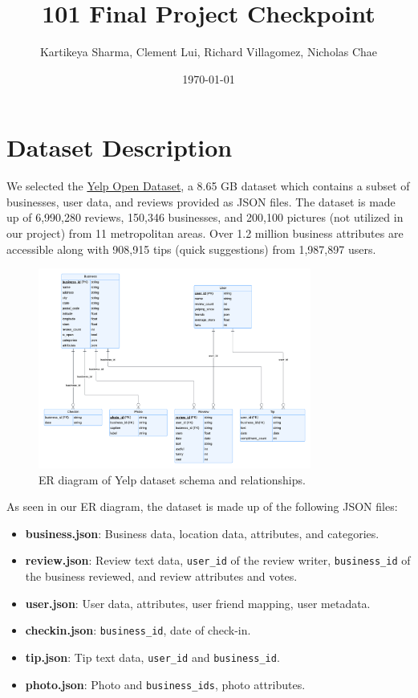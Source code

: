 \documentclass{article}
\title{101 Final Project Checkpoint}
\author{Kartikeya Sharma, Clement Lui, Richard Villagomez, Nicholas Chae}
\date{\today}
\begin{document}
\maketitle

\section{Dataset Description}

We selected the \href{https://www.yelp.com/dataset}{Yelp Open Dataset}, a 8.65 GB dataset which contains a subset of businesses, user data, and reviews provided as JSON files. The dataset is made up of 6,990,280 reviews, 150,346 businesses, and 200,100 pictures (not utilized in our project) from 11 metropolitan areas. Over 1.2 million business attributes are accessible along with 908,915 tips (quick suggestions) from 1,987,897 users.

\begin{figure}[h!]
    \centering
    \includegraphics[width=0.8\textwidth]{er-diagram.png} %
    \caption{ER diagram of Yelp dataset schema and relationships.}
    \label{fig:example} %
\end{figure}


As seen in our ER diagram, the dataset is made up of the following JSON files:
\begin{itemize}
    \item \textbf{business.json}: Business data, location data, attributes, and categories.
    \item \textbf{review.json}: Review text data, \texttt{user\_id} of the review writer, \texttt{business\_id} of the business reviewed, and review attributes and votes.
    \item \textbf{user.json}: User data, attributes, user friend mapping, user metadata.
    \item \textbf{checkin.json}: \texttt{business\_id}, date of check-in.
    \item \textbf{tip.json}: Tip text data, \texttt{user\_id} and \texttt{business\_id}.
    \item \textbf{photo.json}: Photo and \texttt{business\_ids}, photo attributes.
\end{itemize}
\end{document}
